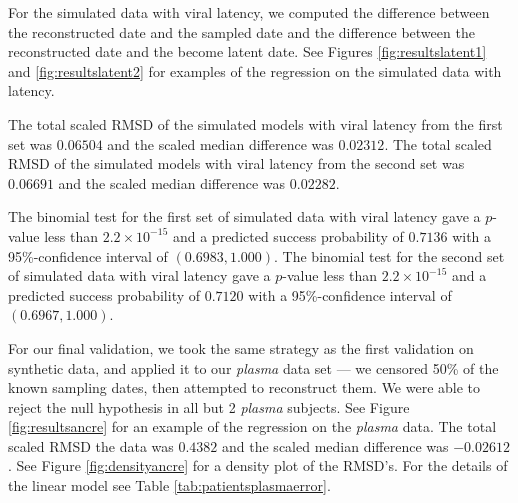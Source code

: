 \documentclass[12pt]{article}
\begin{document}
For the simulated data with viral latency, we computed the difference between the reconstructed date and the sampled date and the difference between the reconstructed date and the become latent date.
See Figures \ref{fig:resultslatent1} and \ref{fig:resultslatent2} for examples of the regression on the simulated data with latency.

The total scaled RMSD of the simulated models with viral latency from the first set was $0.06504$ and the scaled median difference was $0.02312$.
The total scaled RMSD of the simulated models with viral latency from the second set was $0.06691$ and the scaled median difference was $0.02282$.

The binomial test for the first set of simulated data with viral latency gave a $p$-value less than $2.2\times 10^{-15}$ and a predicted success probability of $0.7136$ with a 95\%-confidence interval of $(0.6983, 1.000)$.
The binomial test for the second set of simulated data with viral latency gave a $p$-value less than $2.2\times 10^{-15}$ and a predicted success probability of $0.7120$ with a 95\%-confidence interval of $(0.6967, 1.000)$.


For our final validation, we took the same strategy as the first validation on synthetic data, and applied it to our {\em plasma} data set --- we censored 50\% of the known sampling dates, then attempted to reconstruct them.
We were able to reject the null hypothesis in all but 2 {\em plasma} subjects.
See Figure \ref{fig:resultsancre} for an example of the regression on the \emph{plasma} data.
The total scaled RMSD the data was $0.4382$ and the scaled median difference was $-0.02612$.
See Figure \ref{fig:densityancre} for a density plot of the RMSD's.
For the details of the linear model see Table \ref{tab:patientsplasmaerror}.
\end{document}
